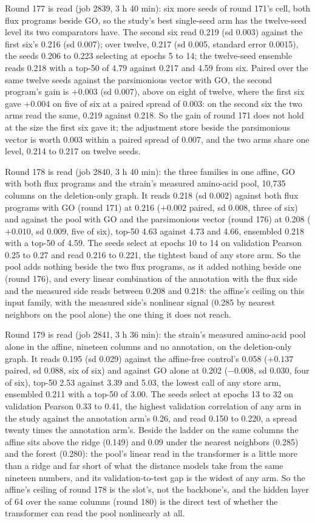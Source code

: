 Round 177 is read (job 2839, 3 h 40 min): six more seeds of round 171's cell, both flux
programs beside GO, so the study's best single-seed arm has the twelve-seed level its
two comparators have. The second six read 0.219 (sd 0.003) against the first six's
0.216 (sd 0.007); over twelve, 0.217 (sd 0.005, standard error 0.0015), the seeds
0.206 to 0.223 selecting at epochs 5 to 14; the twelve-seed ensemble reads 0.218 with
a top-50 of 4.79 against 0.217 and 4.59 from six. Paired over the same twelve seeds
against the parsimonious vector with GO, the second program's gain is $+0.003$
(sd 0.007), above on eight of twelve, where the first six gave $+0.004$ on five of six
at a paired spread of 0.003: on the second six the two arms read the same, 0.219 against
0.218. So the gain of round 171 does not hold at the size the first six gave it; the
adjustment store beside the parsimonious vector is worth 0.003 within a paired spread
of 0.007, and the two arms share one level, 0.214 to 0.217 on twelve seeds.

Round 178 is read (job 2840, 3 h 40 min): the three families in one affine, GO with
both flux programs and the strain's measured amino-acid pool, 10,735 columns on the
deletion-only graph. It reads 0.218 (sd 0.002) against both flux programs with GO
(round 171) at 0.216 ($+0.002$ paired, sd 0.008, three of six) and against the pool
with GO and the parsimonious vector (round 176) at 0.208 ($+0.010$, sd 0.009, five of
six), top-50 4.63 against 4.73 and 4.66, ensembled 0.218 with a top-50 of 4.59. The
seeds select at epochs 10 to 14 on validation Pearson 0.25 to 0.27 and read 0.216 to
0.221, the tightest band of any store arm. So the pool adds nothing beside the two flux
programs, as it added nothing beside one (round 176), and every linear combination of
the annotation with the flux side and the measured side reads between 0.208 and
0.218: the affine's ceiling on this input family, with the measured side's nonlinear
signal (0.285 by nearest neighbors on the pool alone) the one thing it does not reach.

Round 179 is read (job 2841, 3 h 36 min): the strain's measured amino-acid pool alone
in the affine, nineteen columns and no annotation, on the deletion-only graph. It reads
0.195 (sd 0.029) against the affine-free control's 0.058 ($+0.137$ paired, sd 0.088, six
of six) and against GO alone at 0.202 ($-0.008$, sd 0.030, four of six), top-50 2.53
against 3.39 and 5.03, the lowest call of any store arm, ensembled 0.211 with a top-50
of 3.00. The seeds select at epochs 13 to 32 on validation Pearson 0.33 to 0.41, the
highest validation correlation of any arm in the study against the annotation arm's 0.26,
and read 0.150 to 0.220, a spread twenty times the annotation arm's. Beside the ladder on
the same columns the affine sits above the ridge (0.149) and 0.09 under the nearest
neighbors (0.285) and the forest (0.280): the pool's linear read in the transformer is
a little more than a ridge and far short of what the distance models take from the same
nineteen numbers, and its validation-to-test gap is the widest of any arm. So the
affine's ceiling of round 178 is the slot's, not the backbone's, and the hidden layer
of 64 over the same columns (round 180) is the direct test of whether the transformer
can read the pool nonlinearly at all.

